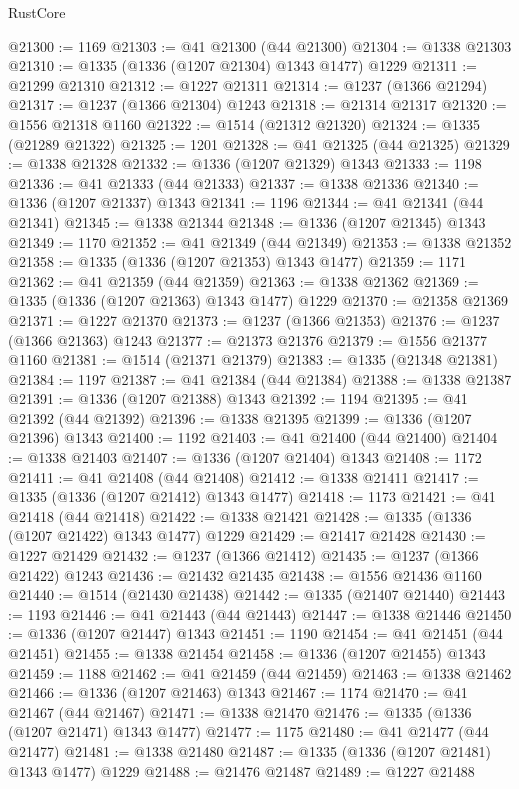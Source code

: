 \begin{lexlean}{RustCore}
\begin{coremodule}
@21300 := 1169
@21303 := @41 @21300 (@44 @21300)
@21304 := @1338 @21303
@21310 := @1335 (@1336 (@1207 @21304) @1343 @1477) @1229
@21311 := @21299 @21310
@21312 := @1227 @21311
@21314 := @1237 (@1366 @21294)
@21317 := @1237 (@1366 @21304) @1243
@21318 := @21314 @21317
@21320 := @1556 @21318 @1160
@21322 := @1514 (@21312 @21320)
@21324 := @1335 (@21289 @21322)
@21325 := 1201
@21328 := @41 @21325 (@44 @21325)
@21329 := @1338 @21328
@21332 := @1336 (@1207 @21329) @1343
@21333 := 1198
@21336 := @41 @21333 (@44 @21333)
@21337 := @1338 @21336
@21340 := @1336 (@1207 @21337) @1343
@21341 := 1196
@21344 := @41 @21341 (@44 @21341)
@21345 := @1338 @21344
@21348 := @1336 (@1207 @21345) @1343
@21349 := 1170
@21352 := @41 @21349 (@44 @21349)
@21353 := @1338 @21352
@21358 := @1335 (@1336 (@1207 @21353) @1343 @1477)
@21359 := 1171
@21362 := @41 @21359 (@44 @21359)
@21363 := @1338 @21362
@21369 := @1335 (@1336 (@1207 @21363) @1343 @1477) @1229
@21370 := @21358 @21369
@21371 := @1227 @21370
@21373 := @1237 (@1366 @21353)
@21376 := @1237 (@1366 @21363) @1243
@21377 := @21373 @21376
@21379 := @1556 @21377 @1160
@21381 := @1514 (@21371 @21379)
@21383 := @1335 (@21348 @21381)
@21384 := 1197
@21387 := @41 @21384 (@44 @21384)
@21388 := @1338 @21387
@21391 := @1336 (@1207 @21388) @1343
@21392 := 1194
@21395 := @41 @21392 (@44 @21392)
@21396 := @1338 @21395
@21399 := @1336 (@1207 @21396) @1343
@21400 := 1192
@21403 := @41 @21400 (@44 @21400)
@21404 := @1338 @21403
@21407 := @1336 (@1207 @21404) @1343
@21408 := 1172
@21411 := @41 @21408 (@44 @21408)
@21412 := @1338 @21411
@21417 := @1335 (@1336 (@1207 @21412) @1343 @1477)
@21418 := 1173
@21421 := @41 @21418 (@44 @21418)
@21422 := @1338 @21421
@21428 := @1335 (@1336 (@1207 @21422) @1343 @1477) @1229
@21429 := @21417 @21428
@21430 := @1227 @21429
@21432 := @1237 (@1366 @21412)
@21435 := @1237 (@1366 @21422) @1243
@21436 := @21432 @21435
@21438 := @1556 @21436 @1160
@21440 := @1514 (@21430 @21438)
@21442 := @1335 (@21407 @21440)
@21443 := 1193
@21446 := @41 @21443 (@44 @21443)
@21447 := @1338 @21446
@21450 := @1336 (@1207 @21447) @1343
@21451 := 1190
@21454 := @41 @21451 (@44 @21451)
@21455 := @1338 @21454
@21458 := @1336 (@1207 @21455) @1343
@21459 := 1188
@21462 := @41 @21459 (@44 @21459)
@21463 := @1338 @21462
@21466 := @1336 (@1207 @21463) @1343
@21467 := 1174
@21470 := @41 @21467 (@44 @21467)
@21471 := @1338 @21470
@21476 := @1335 (@1336 (@1207 @21471) @1343 @1477)
@21477 := 1175
@21480 := @41 @21477 (@44 @21477)
@21481 := @1338 @21480
@21487 := @1335 (@1336 (@1207 @21481) @1343 @1477) @1229
@21488 := @21476 @21487
@21489 := @1227 @21488

\end{coremodule}
\end{lexlean}

